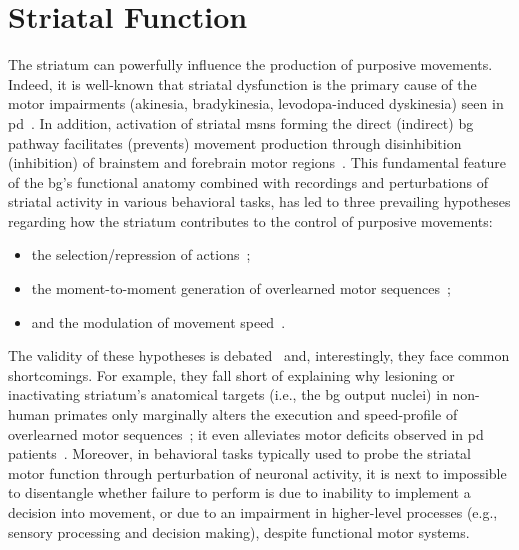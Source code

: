 \section{Striatal Function}
\label{ch:disscusion:lesion}

The striatum can powerfully influence the production of purposive movements.
Indeed, it is well-known that striatal dysfunction is the primary cause of the motor impairments (akinesia, bradykinesia, levodopa-induced dyskinesia) seen in \gls{pd}~\cite{Mink1996}.
In addition, activation of striatal \glspl{msn} forming the direct (indirect) \gls{bg} pathway facilitates (prevents) movement production through disinhibition (inhibition) of brainstem and forebrain motor regions~\cite{Kravitz2010Nature}.
This fundamental feature of the \gls{bg}'s functional anatomy combined with recordings and perturbations of striatal activity in various behavioral tasks, has led to three prevailing hypotheses regarding how the striatum contributes to the control of purposive movements: %
\begin{itemize}[noitemsep]
    \item the selection/repression of actions~\cite{Barnes2005Nature, Cui2013Nature, Klaus2017Neuron, Markowitz2018Cell};
    \item the moment-to-moment generation of overlearned motor sequences~\cite{Dhawale2019};
    \item and the modulation of movement speed~\cite{Kim2014EJN, Rueda2015NN, Barbera2016Neuron, Yttri2016Nature}.
\end{itemize}
The validity of these hypotheses is debated~\cite[for instance, see][]{Dudman2016CurrOpinNeurobiol} and, interestingly, they face common shortcomings.
For example, they fall short of explaining why lesioning or inactivating striatum's anatomical targets (i.e., the \gls{bg} output nuclei) in non-human primates only marginally alters the execution and speed-profile of overlearned motor sequences~\cite{Desmurget2010JNeurosci}; it even alleviates motor deficits observed in \gls{pd} patients~\cite{Turner2010CurrOpinNeurobiol}.
Moreover, in behavioral tasks typically used to probe the striatal motor function through perturbation of neuronal activity, it is next to impossible to disentangle whether failure to perform is due to inability to implement a decision into movement, or due to an impairment in higher-level processes (e.g., sensory processing and decision making), despite functional motor systems.\footnotemark
{}
